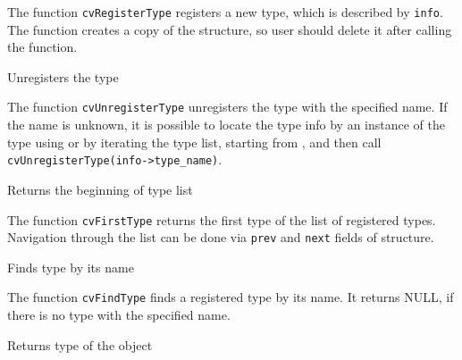 The function \texttt{cvRegisterType} registers a new type, which is
described by \texttt{info}. The function creates a copy of the structure,
so user should delete it after calling the function.

\label{UnregisterType}

Unregisters the type


\begin{description}
\end{description}

The function \texttt{cvUnregisterType} unregisters the type with
the specified name. If the name is unknown, it is possible to locate
the type info by an instance of the type using  or by
iterating the type list, starting from , and then call
\texttt{cvUnregisterType(info->type\_name)}.

\label{FirstType}

Returns the beginning of type list


The function \texttt{cvFirstType} returns the first type of the list of registered types. Navigation through the list can be done via \texttt{prev} and \texttt{next} fields of  structure.

\label{FindType}

Finds type by its name


\begin{description}
\end{description}

The function \texttt{cvFindType} finds a registered type by its name. It returns NULL, if there is no type with the specified name.


\label{TypeOf}

Returns type of the object


